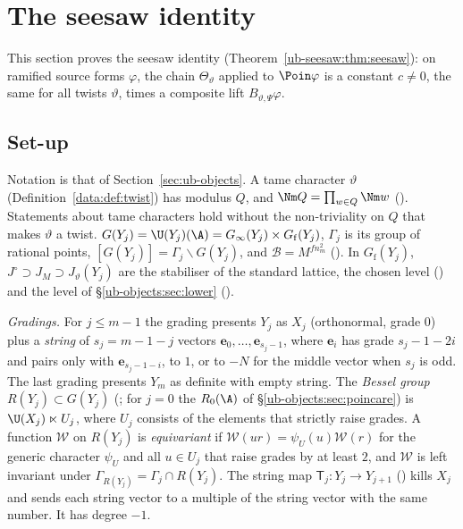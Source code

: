 \section{The seesaw identity}\label{sec:ub-seesaw}

This section proves the seesaw identity 
(Theorem~\ref{ub-seesaw:thm:seesaw}): on ramified source forms $\varphi$, the chain
$\Theta_\vartheta$ applied to $\Poin\varphi$ is a constant $c\neq0$, the same for all twists
$\vartheta$, times a composite lift $B_{\vartheta,\Psi}\varphi$.

\subsection{Set-up}\label{ub-seesaw:sec:setup}

Notation is that of Section~\ref{sec:ub-objects}. A tame character $\vartheta$
(Definition~\ref{data:def:twist}) has modulus $Q$, and
$\Nm Q=\prod_{w\in Q}\Nm w$ (). Statements about tame characters
hold without the non-triviality on $Q$ that makes $\vartheta$ a twist.
$G(Y_j)=\U(Y_j)(\A)=G_\infty(Y_j)\times G_{\mathrm f}(Y_j)$, $\Gamma_j$ is its group of rational points,
$[G(Y_j)]=\Gamma_j\backslash G(Y_j)$, and $\mathcal B=M^{fn_m^2}$ (). In
$G_{\mathrm f}(Y_j)$, $J^\circ\supset J_M\supset J_\vartheta(Y_j)$ are the stabiliser of the standard lattice,
the chosen level () and the level of \S\ref{ub-objects:sec:lower}
().

\emph{Gradings.} For $j\le m-1$ the grading  presents $Y_j$ as $X_j$
(orthonormal, grade $0$) plus a \emph{string} of $s_j=m-1-j$ vectors $\mathbf e_0,\dots,\mathbf e_{s_j-1}$, where
$\mathbf e_i$ has grade $s_j-1-2i$ and pairs only with $\mathbf e_{s_j-1-i}$, to $1$, or to $-N$ for the middle
vector when $s_j$ is odd. The last grading presents $Y_m$ as definite with empty string. The
\emph{Bessel group} $R(Y_j)\subset G(Y_j)$ (; for $j=0$ the $R_0(\A)$ of
\S\ref{ub-objects:sec:poincare}) is $\U(X_j)\ltimes U_j$,
where $U_j$ consists of the elements that strictly raise grades. A function $\mathcal W$ on $R(Y_j)$ is
\emph{equivariant} if $\mathcal W(ur)=\psi_U(u)\mathcal W(r)$ for the generic character $\psi_U$ and all $u\in U_j$
that raise grades by at least $2$, and $\mathcal W$ is left invariant under $\Gamma_{R(Y_j)}=\Gamma_j\cap R(Y_j)$. The string map
$\mathsf T_j\colon Y_j\to Y_{j+1}$ () kills $X_j$ and sends each string vector
to a multiple of the string vector with the same number. It has degree $-1$.

